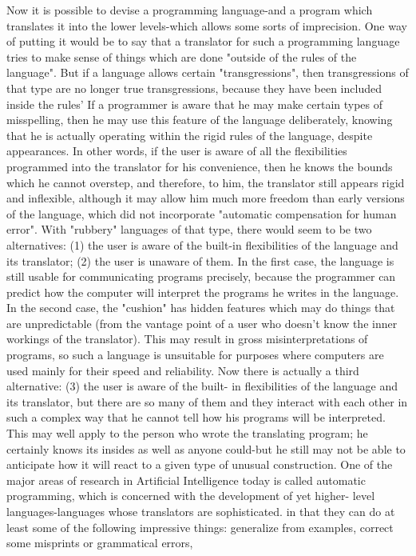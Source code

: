        Now it is possible to devise a programming language-and a program which
       translates it into the lower levels-which allows some sorts of imprecision. One
       way of putting it would be to say that a translator for such a programming
       language tries to make sense of things which are done "outside of the rules of the
       language". But if a language allows certain "transgressions", then transgressions
       of that type are no longer true transgressions, because they have been included
       inside the rules' If a programmer is aware that he may make certain types of
       misspelling, then he may use this feature of the language deliberately, knowing
       that he is actually operating within the rigid rules of the language, despite
       appearances. In other words, if the user is aware of all the flexibilities
       programmed into the translator for his convenience, then he knows the bounds
       which he cannot overstep, and therefore, to him, the translator still appears rigid
       and inflexible, although it may allow him much more freedom than early versions
       of the language, which did not incorporate "automatic compensation for human
       error".
                With "rubbery" languages of that type, there would seem to be two
       alternatives: (1) the user is aware of the built-in flexibilities of the language and
       its translator; (2) the user is unaware of them. In the first case, the language is still
       usable for communicating programs precisely, because the programmer can
       predict how the computer will interpret the programs he writes in the language. In
       the second case, the "cushion" has hidden features which may do things that are
       unpredictable (from the vantage point of a user who doesn't know the inner
       workings of the translator). This may result in gross misinterpretations of
       programs, so such a language is unsuitable for purposes where computers are used
       mainly for their speed and reliability.
                Now there is actually a third alternative: (3) the user is aware of the built-
       in flexibilities of the language and its translator, but there are so many of them
       and they interact with each other in such a complex way that he cannot tell how
       his programs will be interpreted. This may well apply to the person who wrote the
       translating program; he certainly knows its insides as well as anyone could-but he
       still may not be able to anticipate how it will react to a given type of unusual
       construction.
                One of the major areas of research in Artificial Intelligence today is called
       automatic programming, which is concerned with the development of yet higher-
       level languages-languages whose translators are sophisticated. in that they can do
       at least some of the following impressive things: generalize from examples,
       correct some misprints or grammatical errors,




